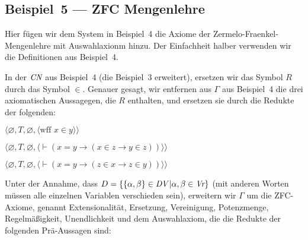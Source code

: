 \subsection{Beispiel~5 --- ZFC Mengenlehre}

Hier fügen wir dem System in Beispiel~4 die Axiome der Zermelo-Fraenkel-Mengenlehre mit Auswahlaxionm hinzu.  Der Einfachheit halber verwenden wir die Definitionen aus Beispiel~4. 

In der $\mbox{\em CN}$ aus Beispiel~4 (die Beispiel~3 erweitert), ersetzen wir das Symbol $R$ durch das Symbol $\in$. Genauer gesagt, wir entfernen aus $\Gamma$ aus Beispiel~4 die drei axiomatischen Aussagegen, die $R$ enthalten, und ersetzen sie durch die Redukte der folgenden: 
\begin{list}{}{\itemsep 0.0pt}
      \item[] $\langle\varnothing,T,\varnothing,
               \langle \mbox{wff\ }x\in y\rangle\rangle$
      \item[] $\langle\varnothing,T,
               \varnothing,
               \langle \vdash(x=y\to(x\in z\to y\in z))\rangle\rangle$
      \item[] $\langle\varnothing,T,
               \varnothing,
               \langle \vdash(x=y\to(z\in x\to z\in y))\rangle\rangle$
\end{list}
Unter der Annahme, dass $D=\{\{\alpha,\beta\}\in \mbox{\em DV}\,|\alpha,\beta\in \mbox{\em Vr}\}$ (mit anderen Worten müssen alle einzelnen Variablen verschieden sein), erweitern wir $\Gamma$ um die ZFC-Axiome, genannt 
Extensionalität,
Ersetzung,
Vereinigung,
Potenzmenge,
Regelmäßigkeit,
Unendlichkeit und
dem Auswahlaxiom, die die Redukte der folgenden Prä-Aussagen sind: 

